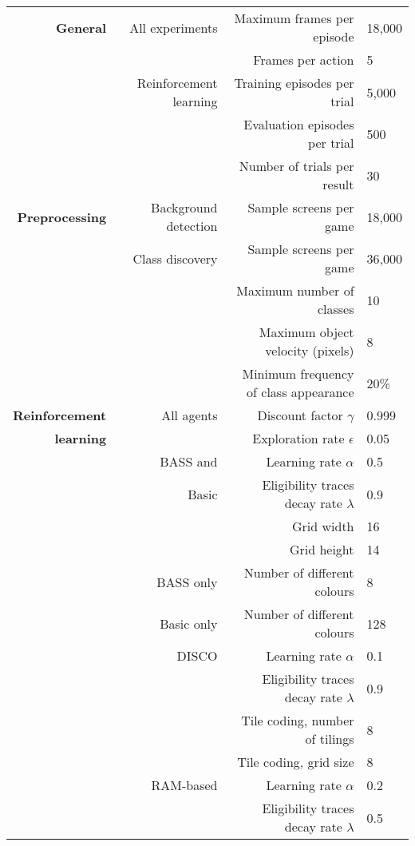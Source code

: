 \documentclass[twoside,11pt]{article}
\begin{document}
\begin{table}[h!]
\small
\begin{center}
\begin{tabular}{|r||r||r|l|}
\hline
\textbf{General} & All experiments & Maximum frames per episode & 18,000 \\
\cline{3-4}
& & Frames per action & 5 \\
\cline{2-4}
& Reinforcement learning & Training episodes per trial & 5,000 \\
\cline{3-4}
& & Evaluation episodes per trial & 500 \\
\cline{3-4}
& & Number of trials per result & 30 \\ 
\hline
\hline
\textbf{Preprocessing} & Background detection & Sample screens per game & 18,000 \\
\cline{2-4}
& Class discovery & Sample screens per game & 36,000 \\
\cline{3-4}
& & Maximum number of classes & 10 \\
\cline{3-4}
& & Maximum object velocity (pixels) & 8 \\
\cline{3-4}
& & Minimum frequency of class appearance & 20\% \\
\hline
\hline
\textbf{Reinforcement} & All agents & Discount factor $\gamma$ & 0.999 \\
\cline{3-4} 
\textbf{learning} & & Exploration rate $\epsilon$ & 0.05 \\
\cline{2-4} 

& BASS and & Learning rate $\alpha$ & 0.5 \\
\cline{3-4}
& Basic & Eligibility traces decay rate $\lambda$ & 0.9 \\
\cline{3-4}
& & Grid width & 16 \\
\cline{3-4}
& & Grid height & 14 \\
\cline{2-4}
& BASS only & Number of different colours & 8 \\
\cline{2-4}
& Basic only & Number of different colours & 128 \\
\cline{2-4}

& DISCO & Learning rate $\alpha$ & 0.1 \\
\cline{3-4}
& & Eligibility traces decay rate $\lambda$ & 0.9 \\
\cline{3-4}
& & Tile coding, number of tilings & 8 \\ 
\cline{3-4}
& & Tile coding, grid size & 8 \\ 
\cline{2-4}

& RAM-based & Learning rate $\alpha$ & 0.2 \\
\cline{3-4}
& & Eligibility traces decay rate $\lambda$ & 0.5 \\
\cline{2-4}


\end{tabular}
\end{center}
\end{table}
\end{document}
